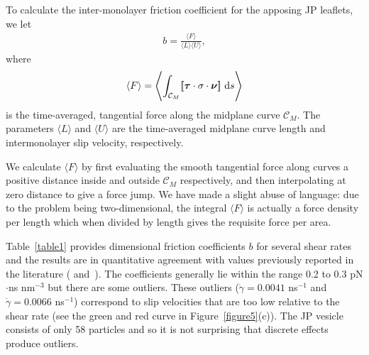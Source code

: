 \documentclass[lineno]{jfm}
\newcommand{\nnu}{\boldsymbol{\nu}}
\newcommand{\ttau}{\boldsymbol{\tau}}
\newcommand{\jump}[1]{[\![ #1 ]\!]}
\begin{document}
To calculate the inter-monolayer friction coefficient for the apposing
JP leaflets, we let
\begin{align}
  b = \frac{\langle F\rangle}{\langle L \rangle \langle U\rangle},
\end{align}
%
where 
\begin{align}
  \langle F\rangle = \left\langle \int_{\mathcal{C}_M} 
    \jump{\ttau \cdot \sigma \cdot \nnu} \,\dif s \right\rangle
\end{align}
is the time-averaged, tangential force along the midplane curve
$\mathcal{C}_M$. The parameters $\langle L\rangle$ and $\langle
U\rangle$ are the time-averaged midplane curve length and intermonolayer
slip velocity, respectively.

We calculate $\langle F\rangle$ by first evaluating the smooth
tangential force along curves a positive distance inside and outside
$\mathcal{C}_M$ respectively, and then interpolating at zero distance to
give a force jump. We have made a slight abuse of language: due to the
problem being two-dimensional, the integral $\langle F\rangle$ is
actually a force density per length which when divided by length gives
the requisite force per area. 

Table~\ref{table1} provides dimensional friction coefficients $b$ for
several shear rates and the results are in quantitative agreement with
values previously reported in the literature (\cite{sch-vla-mik2010}
and~\cite{denOtter2007}). The coefficients generally lie within the
range 0.2 to 0.3 pN$\cdot$ns nm$^{-3}$ but there are some outliers.
These outliers ($\dot\gamma = 0.0041$ ns$^{-1}$ and $\dot\gamma =
0.0066$ ns$^{-1}$) correspond to slip velocities that are too low
relative to the shear rate (see the green and red curve in
Figure~\ref{figure5}(c)). The JP vesicle consists of only 58 particles
and so it is not surprising that discrete effects produce outliers.

%
\end{document}
